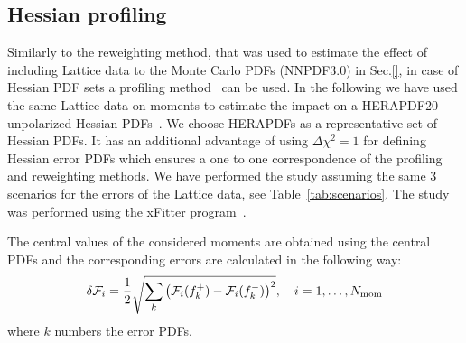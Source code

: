 \subsection{Hessian profiling}
\label{sec:hessianprofiling}



Similarly to the reweighting method, that was used to estimate the effect of including Lattice
data to the Monte Carlo PDFs (NNPDF3.0) in Sec.\ref{}, in case of Hessian PDF sets a profiling
method~\cite{Paukkunen:2014zia,Camarda:2015zba} can be used.
In the following we have used the same Lattice data on moments to estimate the impact
on a HERAPDF20 unpolarized Hessian PDFs~\cite{Abramowicz:2015mha}. We choose HERAPDFs as a
representative set of Hessian PDFs. It has an additional advantage of using $\Delta\chi^2=1$ for
defining Hessian error PDFs which ensures a one to one correspondence of the profiling and
reweighting methods.
We have performed the study assuming the same 3 scenarios for the errors of the Lattice data,
see Table~\ref{tab:scenarios}. The study was performed using the xFitter program~\cite{Alekhin:2014irh}.

The central values of the considered moments are obtained using the central PDFs and the corresponding
errors are calculated in the following way:
\begin{equation}
\delta\mathcal{F}_i = \frac{1}{2} \sqrt{\sum_{k}\left(\mathcal{F}_i(f_k^+)-\mathcal{F}_i(f_k^-)\right)^2},
\quad i=1,\ldots,N_{\rm mom}
\end{equation}
where $k$ numbers the error PDFs.

